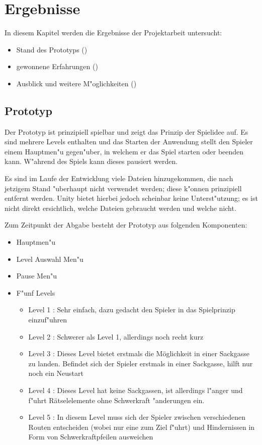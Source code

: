\section{Ergebnisse}
\label{sec:results}
%
In diesem Kapitel werden die Ergebnisse der Projektarbeit untersucht:
\begin{itemize}
	\item
		Stand des Prototyps ()
	\item
		gewonnene Erfahrungen ()
	\item
		Ausblick und weitere M"oglichkeiten ()
\end{itemize}
%
\subsection{Prototyp}
\label{sec:results/prototype}
%
Der Prototyp ist prinzipiell spielbar und zeigt das Prinzip der
Spielidee auf. Es sind mehrere Levels enthalten und das Starten
der Anwendung stellt den Spieler einem Hauptmen"u gegen"uber, in
welchem er das Spiel starten oder beenden kann. W"ahrend des Spiels
kann dieses pausiert werden.

Es sind im Laufe der Entwicklung viele Dateien hinzugekommen, die
nach jetzigem Stand "uberhaupt nicht verwendet werden; diese k"onnen
prinzipiell entfernt werden. Unity bietet hierbei jedoch scheinbar
keine Unterst"utzung; es ist nicht direkt ersichtlich, welche
Dateien gebraucht werden und welche nicht.

Zum Zeitpunkt der Abgabe besteht der Prototyp aus folgenden Komponenten:
\begin{itemize}
	\item Hauptmen"u
	\item Level Auswahl Men"u
	\item Pause Men"u
	\item F"unf Levels
	\begin{itemize}
		\item Level 1 : Sehr einfach, dazu gedacht den Spieler in das Spielprinzip einzuf"uhren
		\item Level 2 : Schwerer als Level 1, allerdings noch recht kurz
		\item Level 3 : Dieses Level bietet erstmals die Möglichkeit in einer Sackgasse zu landen.
			Befindet sich der Spieler erstmals in einer Sackgasse, hilft nur noch ein Neustart
		\item Level 4 : Dieses Level hat keine Sackgassen, ist allerdings l"anger und f"uhrt
			Rätselelemente ohne Schwerkraft "anderungen ein.
		\item Level 5 : In diesem Level muss sich der Spieler zwischen verschiedenen Routen
			entscheiden (wobei nur eine zum Ziel f"uhrt) und Hindernissen in Form von
			Schwerkraftpfeilen ausweichen
	\end{itemize}
\end{itemize}

